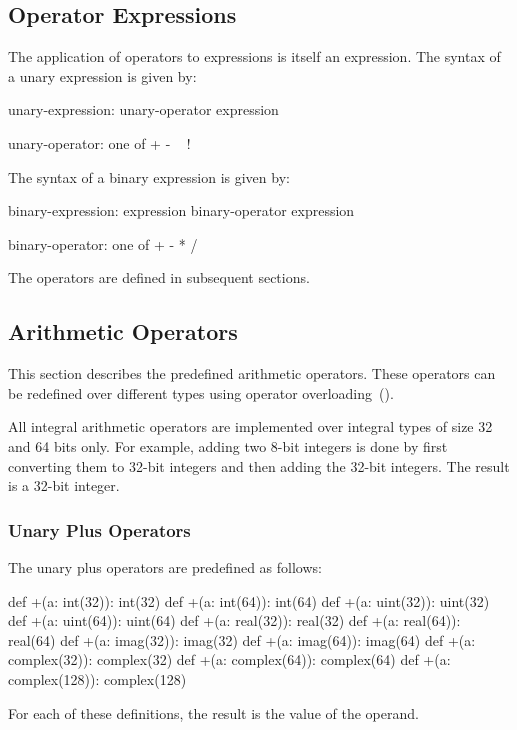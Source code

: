 \subsection{Operator Expressions}
\label{Binary_Expressions}
\label{Unary_Expressions}

The application of operators to expressions is itself an expression.
The syntax of a unary expression is given by:
\begin{syntax}
unary-expression:
  unary-operator expression

unary-operator: one of
  + - ~ !
\end{syntax}

The syntax of a binary expression is given by:
\begin{syntax}
binary-expression:
  expression binary-operator expression

binary-operator: one of
  + - * / %
\end{syntax}

The operators are defined in subsequent sections.

\subsection{Arithmetic Operators}
\label{Arithmetic_Operators}

This section describes the predefined arithmetic operators.  These
operators can be redefined over different types using operator
overloading~().

All integral arithmetic operators are implemented over integral types
of size 32 and 64 bits only.  For example, adding two 8-bit integers
is done by first converting them to 32-bit integers and then adding
the 32-bit integers.  The result is a 32-bit integer.

\subsubsection{Unary Plus Operators}
\label{Unary_Plus_Operators}

The unary plus operators are predefined as follows:
\begin{chapel}
def +(a: int(32)): int(32)
def +(a: int(64)): int(64)
def +(a: uint(32)): uint(32)
def +(a: uint(64)): uint(64)
def +(a: real(32)): real(32)
def +(a: real(64)): real(64)
def +(a: imag(32)): imag(32)
def +(a: imag(64)): imag(64)
def +(a: complex(32)): complex(32)
def +(a: complex(64)): complex(64)
def +(a: complex(128)): complex(128)
\end{chapel}
For each of these definitions, the result is the value of the operand.

